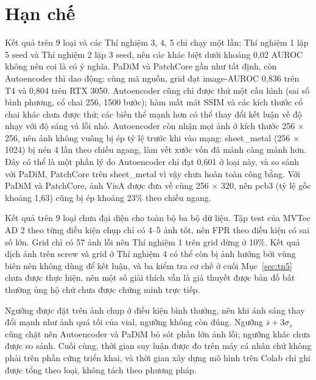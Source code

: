 \section{Hạn chế}
\label{sec:han-che}

Kết quả trên 9 loại và các Thí nghiệm 3, 4, 5 chỉ chạy một lần; Thí nghiệm 1 lặp 5 seed và Thí nghiệm 2 lặp 3 seed,
nên các khác biệt dưới khoảng 0,02 AUROC không nên coi là có ý nghĩa. PaDiM và PatchCore gần như tất định, còn
Autoencoder thì dao động: cùng mã nguồn, grid đạt image-AUROC 0,836 trên T4 và 0,804 trên RTX 3050. Autoencoder
cũng chỉ được thử một cấu hình (sai số bình phương, cổ chai 256, 1500 bước); hàm mất mát SSIM và các kích thước cổ
chai khác chưa được thử; các biến thể mạnh hơn có thể thay đổi kết luận về độ nhạy với độ sáng và lỗi nhỏ.
Autoencoder còn nhận mọi ảnh ở kích thước 256 $\times$ 256, nên ảnh không vuông bị ép tỷ lệ trước khi vào mạng:
sheet\_metal (256 $\times$ 1024) bị nén 4 lần theo chiều ngang, làm vết xước vốn đã mảnh càng mảnh hơn. Đây có thể là
một phần lý do Autoencoder chỉ đạt 0,601 ở loại này, và so sánh với PaDiM, PatchCore trên sheet\_metal vì vậy chưa
hoàn toàn công bằng. Với PaDiM và PatchCore, ảnh VisA được đưa về cùng 256 $\times$ 320, nên pcb3 (tỷ lệ gốc khoảng
1,63) cũng bị ép khoảng 23\% theo chiều ngang.

Kết quả trên 9 loại chưa đại diện cho toàn bộ ba bộ dữ liệu. Tập test của MVTec AD 2 theo từng điều kiện chụp chỉ có
4--5 ảnh tốt, nên FPR theo điều kiện có sai số lớn. Grid chỉ có 57 ảnh lỗi nên Thí nghiệm 1 trên grid dừng ở 10\%.
Kết quả dịch ảnh trên screw và grid ở Thí nghiệm 4 có thể còn bị ảnh hưởng bởi vùng biên nên không dùng để kết luận,
và ba kiểm tra cơ chế ở cuối Mục~\ref{sec:tn5} chưa được thực hiện, nên một số giải thích vẫn là giả thuyết được bản
đồ bất thường ủng hộ chứ chưa được chứng minh trực tiếp.

Ngưỡng được đặt trên ảnh chụp ở điều kiện bình thường, nên khi ánh sáng thay đổi mạnh như ảnh quá tối của vial, ngưỡng
không còn đúng. Ngưỡng $\bar{s} + 3\sigma_s$ cũng chặt nên Autoencoder và PaDiM bỏ sót phần lớn ảnh lỗi; ngưỡng khác
chưa được so sánh. Cuối cùng, thời gian suy luận được đo trên máy cá nhân chứ không phải trên phần cứng triển khai,
và thời gian xây dựng mô hình trên Colab chỉ ghi được tổng theo loại, không tách theo phương pháp.
